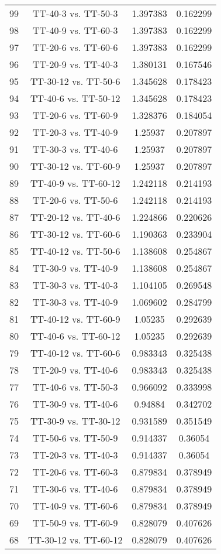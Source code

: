 \documentclass[a4paper,10pt]{article}
\begin{document}
\begin{landscape}
\begin{table}[!htp]
\begin{tabular}{cccc}
99&TT-40-3 vs. TT-50-3&1.397383&0.162299\\
98&TT-40-9 vs. TT-60-3&1.397383&0.162299\\
97&TT-20-6 vs. TT-60-6&1.397383&0.162299\\
96&TT-20-9 vs. TT-40-3&1.380131&0.167546\\
95&TT-30-12 vs. TT-50-6&1.345628&0.178423\\
94&TT-40-6 vs. TT-50-12&1.345628&0.178423\\
93&TT-20-6 vs. TT-60-9&1.328376&0.184054\\
92&TT-20-3 vs. TT-40-9&1.25937&0.207897\\
91&TT-30-3 vs. TT-40-6&1.25937&0.207897\\
90&TT-30-12 vs. TT-60-9&1.25937&0.207897\\
89&TT-40-9 vs. TT-60-12&1.242118&0.214193\\
88&TT-20-6 vs. TT-50-6&1.242118&0.214193\\
87&TT-20-12 vs. TT-40-6&1.224866&0.220626\\
86&TT-30-12 vs. TT-60-6&1.190363&0.233904\\
85&TT-40-12 vs. TT-50-6&1.138608&0.254867\\
84&TT-30-9 vs. TT-40-9&1.138608&0.254867\\
83&TT-30-3 vs. TT-40-3&1.104105&0.269548\\
82&TT-30-3 vs. TT-40-9&1.069602&0.284799\\
81&TT-40-12 vs. TT-60-9&1.05235&0.292639\\
80&TT-40-6 vs. TT-60-12&1.05235&0.292639\\
79&TT-40-12 vs. TT-60-6&0.983343&0.325438\\
78&TT-20-9 vs. TT-40-6&0.983343&0.325438\\
77&TT-40-6 vs. TT-50-3&0.966092&0.333998\\
76&TT-30-9 vs. TT-40-6&0.94884&0.342702\\
75&TT-30-9 vs. TT-30-12&0.931589&0.351549\\
74&TT-50-6 vs. TT-50-9&0.914337&0.36054\\
73&TT-20-3 vs. TT-40-3&0.914337&0.36054\\
72&TT-20-6 vs. TT-60-3&0.879834&0.378949\\
71&TT-30-6 vs. TT-40-6&0.879834&0.378949\\
70&TT-40-9 vs. TT-60-6&0.879834&0.378949\\
69&TT-50-9 vs. TT-60-9&0.828079&0.407626\\
68&TT-30-12 vs. TT-60-12&0.828079&0.407626\\

\end{tabular}
\end{table}
\end{landscape}
\end{document}
